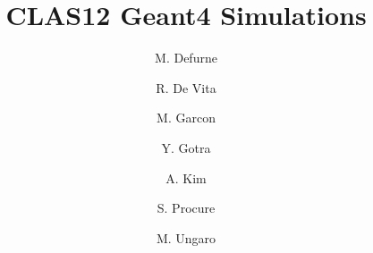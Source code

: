 \title{CLAS12 Geant4 Simulations}



\author[C]{M. Defurne}
\author[B]{R. De Vita}
\author[C]{M. Garcon}
\author[A]{Y. Gotra}
\author[D]{A. Kim}
\author[C]{S. Procure}
\author[A]{M. Ungaro}

\address[A]{Thomas Jefferson National Accelerator Facility, Newport News, VA, USA}
\address[B]{Istituto Nazionale Di Fisica Nucleare, Genova, Italy}
\address[C]{IRFU, CEA, Universit ́e Paris-Saclay, F-91191 Gif-sur-Yvette, France}
\address[D]{University of Connecticut, Storrs, Connecticut}

